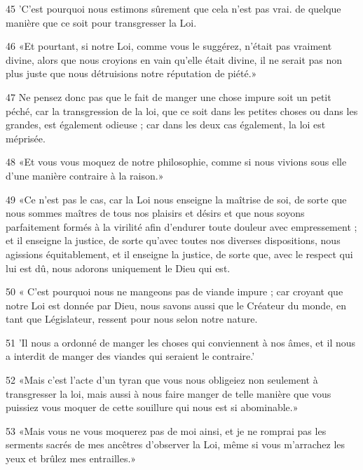 \par 45 'C'est pourquoi nous estimons sûrement que cela n'est pas vrai. de quelque manière que ce soit pour transgresser la Loi.

\par 46 «Et pourtant, si notre Loi, comme vous le suggérez, n'était pas vraiment divine, alors que nous croyions en vain qu'elle était divine, il ne serait pas non plus juste que nous détruisions notre réputation de piété.»

\par 47 Ne pensez donc pas que le fait de manger une chose impure soit un petit péché, car la transgression de la loi, que ce soit dans les petites choses ou dans les grandes, est également odieuse ; car dans les deux cas également, la loi est méprisée.

\par 48 «Et vous vous moquez de notre philosophie, comme si nous vivions sous elle d'une manière contraire à la raison.»

\par 49 «Ce n'est pas le cas, car la Loi nous enseigne la maîtrise de soi, de sorte que nous sommes maîtres de tous nos plaisirs et désirs et que nous soyons parfaitement formés à la virilité afin d'endurer toute douleur avec empressement ; et il enseigne la justice, de sorte qu'avec toutes nos diverses dispositions, nous agissions équitablement, et il enseigne la justice, de sorte que, avec le respect qui lui est dû, nous adorons uniquement le Dieu qui est.

\par 50 « C'est pourquoi nous ne mangeons pas de viande impure ; car croyant que notre Loi est donnée par Dieu, nous savons aussi que le Créateur du monde, en tant que Législateur, ressent pour nous selon notre nature.

\par 51 'Il nous a ordonné de manger les choses qui conviennent à nos âmes, et il nous a interdit de manger des viandes qui seraient le contraire.'

\par 52 «Mais c'est l'acte d'un tyran que vous nous obligeiez non seulement à transgresser la loi, mais aussi à nous faire manger de telle manière que vous puissiez vous moquer de cette souillure qui nous est si abominable.»

\par 53 «Mais vous ne vous moquerez pas de moi ainsi, et je ne romprai pas les serments sacrés de mes ancêtres d'observer la Loi, même si vous m'arrachez les yeux et brûlez mes entrailles.»

